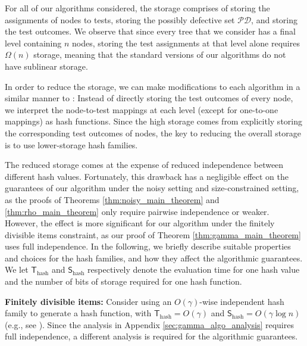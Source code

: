 For all of our algorithms considered, the storage comprises of storing the assignments of nodes to tests, storing the possibly defective set $\mathcal{PD}$, and storing the test outcomes.  We observe that since every tree that we consider has a final level containing $n$ nodes, storing the test assignments at that level alone requires $\Omega(n)$ storage, meaning that the standard versions of our algorithms do not have sublinear storage.


In order to reduce the storage, we can make modifications to each algorithm in a similar manner to \cite{Eri20}:  Instead of directly storing the test outcomes of every node, we interpret the node-to-test mappings at each level (except for one-to-one mappings) as hash functions. Since the high storage comes from explicitly storing the corresponding test outcomes of nodes, the key to reducing the overall storage is to use lower-storage hash families. 

The reduced storage comes at the expense of reduced independence between different hash values. Fortunately, this drawback has a negligible effect on the guarantees of our algorithm under the noisy setting and size-constrained setting, as the proofs of Theorems \ref{thm:noisy_main_theorem} and \ref{thm:rho_main_theorem} only require pairwise independence or weaker. However, the effect is more significant for our algorithm under the finitely divisible items constraint, as our proof of Theorem \ref{thm:gamma_main_theorem} uses full independence.  In the following, we briefly describe suitable properties and choices for the hash families, and how they affect the algorithmic guarantees.  We let $\mathsf{T}_{\text{hash}}$ and $\mathsf{S}_{\text{hash}}$ respectively denote the evaluation time for one hash value and the number of bits of storage required for one hash function.

\textbf{Finitely divisible items:} Consider using an $O(\gamma)$-wise independent hash family to generate a hash function, with $\mathsf{T}_{\text{hash}}=O(\gamma)$ and $\mathsf{S}_{\text{hash}}=O(\gamma\log n)$ (e.g., see \cite[Section 3.1]{Eri20}). Since the analysis in Appendix \ref{sec:gamma_algo_analysis} requires full independence, a different analysis is required for the algorithmic guarantees. 


